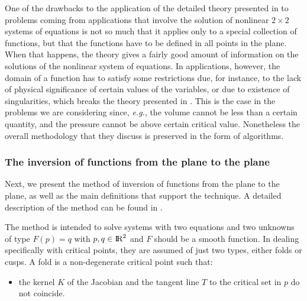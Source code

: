 \documentclass[journal=iecred,manuscript=article]{achemso}
\theoremstyle{definition}
\theoremstyle{remark}
\begin{document}
One of the drawbacks to the application of the detailed 
theory 
presented in 
\citet{malta} to problems coming from applications 
that involve the solution of nonlinear $2\times 2$ systems of 
equations
is not so much that it applies only to a special collection of
functions, but that the functions have to be defined 
in all points in the plane. When that happens, 
the theory gives a fairly good amount
of information on the solutions of the nonlinear system of 
equations.
In applications, however,  the domain of a function has to
satisfy some 
restrictions due, for instance, to the lack of physical
 significance
of certain values of the variables,
 or due to existence of singularities, 
which breaks the theory presented in \citet{malta}.
This is the case in the problems we are considering
since, {\em e.g.}, the volume cannot be less than a certain 
quantity,
and the pressure cannot be above certain critical value.
 Nonetheless
the overall methodology that they discuss is preserved 
in the form of algorithms.

\subsubsection{The inversion of functions from the plane to the plane}
Next, we present 
the method of inversion of functions from the plane to 
the plane,  as well as the main definitions 
that support the technique. A detailed description of the 
method can be found in \citet{malta}.

The method is intended to solve systems with two equations and
 two unknowns of type $ F\left(p\right) = q $ with $ p, q \in 
{\text{I\!R}}^2 $ and $ F $ should be a smooth function. In dealing specifically with critical points, they are assumed of just two types, either folds or cusps. 
A fold is a non-degenerate critical point such that:
%
\begin{itemize}
\item the kernel $ K $ of the Jacobian and the tangent line $ T $ to the critical set in $ p $ do not coincide.
\end{itemize}
\end{document}
